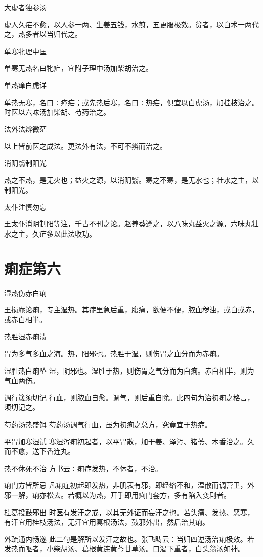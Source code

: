 \documentclass[a4paper,12pt,UTF8,twoside]{ctexbook}
\begin{document}
	大虚者独参汤
	
  虚人久疟不愈，以人参一两、生姜五钱，水煎，五更服极效。贫者，以白术一两代之，热多者以当归代之。
	
	单寒牝理中匡
	
  单寒无热名曰牝疟，宜附子理中汤加柴胡治之。
	
	单热瘅白虎详
	
  单热无寒，名曰∶瘅疟；或先热后寒，名曰∶热疟，俱宜以白虎汤，加桂枝治之。时医以六味汤加柴胡、芍药治之。
	
	法外法辨微茫
	
  以上皆前医之成法。更法外有法，不可不辨而治之。
	
	消阴翳制阳光
	
  热之不热，是无火也；益火之源，以消阴翳。寒之不寒，是无水也；壮水之主，以制阳光。
	
	太仆注慎勿忘
	
  王太仆消阴制阳等注，千古不刊之论。赵养葵遵之，以八味丸益火之源，六味丸壮水之主，久疟多以此法收功。
	
  \chapter{痢症第六}
  湿热伤赤白痢
  
  王损庵论痢，专主湿热。其症里急后重，腹痛，欲便不便，脓血秽浊，或白或赤，或赤白相半。
    
  热胜湿赤痢渍
  
  胃为多气多血之海。热，阳邪也。热胜于湿，则伤胃之血分而为赤痢。
    
  湿胜热白痢坠
  湿，阴邪也。湿胜于热，则伤胃之气分而为白痢。赤白相半，则为气血两伤。
    
  调行箴须切记
  行血，则脓血自愈。调气，则后重自除。此四句为治初痢之格言，须切记之。
    
  芍药汤热盛饵
  芍药汤调气行血，虽为初痢之总方，究竟宜于热症。
    
  平胃加寒湿试
  寒湿泻痢初起者，以平胃散，加干姜、泽泻、猪苓、木香治之。久而不愈，送下香连丸。
    
  热不休死不治
  方书云∶痢症发热，不休者，不治。
    
  痢门方皆所忌
  凡痢症初起即发热，非肌表有邪，即经络不和，温散而调营卫，外邪一解，痢亦松去。若概以为热，开手即用痢门套方，多有陷入变剧者。
    
  桂葛投鼓邪出
  时医有发汗之戒，以其无外证而妄汗之也。若头痛、发热、恶寒，有汗宜用桂枝汤法，无汗宜用葛根汤法，鼓邪外出，然后治其痢。
    
  外疏通内畅遂
  此二句是解所以发汗之故也。张飞畴云∶当归四逆汤治痢极效。若发热而呕者，小柴胡汤、葛根黄连黄芩甘草汤。口渴下重者，白头翁汤如神。
    
\end{document}
